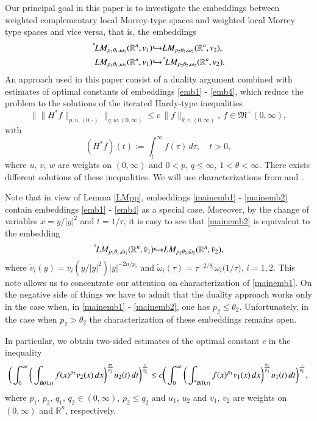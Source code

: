 \documentclass[11pt]{amsart}
\theoremstyle{plain}
\theoremstyle{definition}
\numberwithin{thm}{section}
\numberwithin{equation}{section}
\begin{document}
Our principal goal in this paper is to investigate the embeddings
between weighted complementary local Morrey-type spaces and weighted local Morrey type spaces and vice versa, that is, the embeddings
\begin{align}
{\,^{^{\bf c}}\!} LM_{p_1 {\theta}_1, {\omega}_1}({{\mathbb R}^n},v_1) & {\hookrightarrow} LM_{p_2 {\theta}_2, {\omega}_2}({{\mathbb R}^n},v_2), \label{mainemb1}\\
LM_{p_1 {\theta}_1, {\omega}_1}({{\mathbb R}^n},v_1) & {\hookrightarrow} {\,^{^{\bf c}}\!} LM_{p_2 {\theta}_2, {\omega}_2}({{\mathbb R}^n},v_2).
\label{mainemb2}
\end{align}
An approach used in this paper consist of a duality argument combined with
estimates of optimal constants of embeddings \eqref{emb1} - \eqref{emb4},
which reduce the problem to the solutions of the iterated Hardy-type
inequalities  
\begin{equation}\label{eq.4.11}
\big\| \|H^* f\|_{p,u,(0,\cdot)}\big\|_{q,w,{(0,{\infty})}}\leq c
\,\|f\|_{\theta,v,{(0,{\infty})}},~f \in {\mathfrak M}^+{(0,{\infty})},
\end{equation}
with
$$
(H^*f)(t):= \int_t^{\infty} f(\tau) \, d\tau, \quad t > 0,
$$
where $u,\,v,\,w$ are weights on $(0,\infty)$ and $0 < p,\,q \le \infty$, $1 < \theta < \infty$. There exists different solutions of these inequalities. We will use  characterizations from  \cite{gmp} and \cite{gop}. 

Note that in view of Lemma \ref{LMpp}, embeddings \eqref{mainemb1} - \eqref{mainemb2} contain embeddings \eqref{emb1} - \eqref{emb4} as a special case. Moreover, by the change of
variables $x = {y} / {|y|^2}$ and $t={1} / {\tau}$, it is easy to see that \eqref{mainemb2} is equivalent to the embedding
$$
{\,^{^{\bf c}}\!} LM_{p_1{\theta}_1,\tilde {\omega}_1}({{\mathbb R}^n},\tilde{v}_1) {\hookrightarrow}
LM_{p_2{\theta}_2,\tilde {\omega}_2}({{\mathbb R}^n},\tilde{v}_2),
$$
where $\tilde{v}_i (y) = v_i(y/|y|^2)|y|^{-2n/p_i}$ and
$\tilde{\omega}_i (\tau) = \tau^{- {2} / {{\theta}_i}} {\omega}_i\big({1} / {\tau}\big)$,
$i=1,2$. This note allows us to concentrate our attention
on characterization of \eqref{mainemb1}. On the negative side of
things we have to admit that the duality approach works only in the
case when, in \eqref{mainemb1} - \eqref{mainemb2}, one has $p_2 \le
\theta_2$. Unfortunately, in the case when $p_2 > \theta_2$ the
characterization of these embeddings remains open.

In particular, we obtain two-sided estimates of the optimal constant
$c$ in the inequality
\begin{equation*}
\bigg( \int_0^{\infty} \bigg( \int_{{B(0,t)}} f(x)^{p_2}v_2(x)\,dx \bigg)^{\frac{q_2}{p_2}} u_2(t)\,dt\bigg)^{\frac{1}{q_2}} \le c \bigg( \int_0^{\infty} \bigg( \int_{{\,^{^{\bf c}}\!}{{B(0,t)}}} f(x)^{p_1} v_1(x)\,dx\bigg)^{\frac{q_1}{p_1}} u_1(t)\,dt\bigg)^{\frac{1}{q_1}},
\end{equation*}
where $p_1,\,p_2,\,q_1,\,q_2 \in (0,\infty)$, $p_2 \le q_2$ and $u_1,\,u_2$ and $v_1,\,v_2$ are weights on ${(0,{\infty})}$ and ${{\mathbb R}^n}$, respectively.
\end{document}
